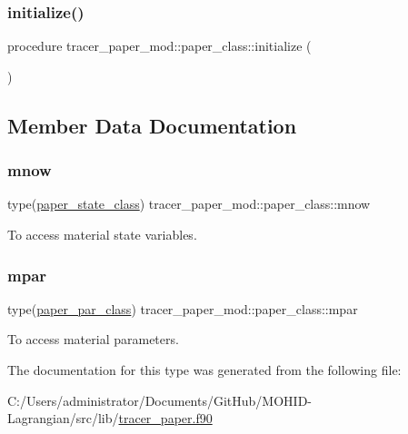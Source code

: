 \subsubsection{\texorpdfstring{initialize()}{initialize()}}
{\footnotesize\ttfamily procedure tracer\+\_\+paper\+\_\+mod\+::paper\+\_\+class\+::initialize (\begin{DoxyParamCaption}{ }\end{DoxyParamCaption})\hspace{0.3cm}{\ttfamily [private]}}



\subsection{Member Data Documentation}
\mbox{\label{structtracer__paper__mod_1_1paper__class_a7156f27ec83059ac3b701502a4320858}} 
\subsubsection{\texorpdfstring{mnow}{mnow}}
{\footnotesize\ttfamily type(\hyperlink{structtracer__paper__mod_1_1paper__state__class}{paper\+\_\+state\+\_\+class}) tracer\+\_\+paper\+\_\+mod\+::paper\+\_\+class\+::mnow\hspace{0.3cm}{\ttfamily [private]}}



To access material state variables. 

\mbox{\label{structtracer__paper__mod_1_1paper__class_a23ace4a6e578ffccaf1d5dcd91dc09b3}} 
\subsubsection{\texorpdfstring{mpar}{mpar}}
{\footnotesize\ttfamily type(\hyperlink{structtracer__paper__mod_1_1paper__par__class}{paper\+\_\+par\+\_\+class}) tracer\+\_\+paper\+\_\+mod\+::paper\+\_\+class\+::mpar\hspace{0.3cm}{\ttfamily [private]}}



To access material parameters. 



The documentation for this type was generated from the following file\+:\begin{DoxyCompactItemize}
\item 
C\+:/\+Users/administrator/\+Documents/\+Git\+Hub/\+M\+O\+H\+I\+D-\/\+Lagrangian/src/lib/\hyperlink{tracer__paper_8f90}{tracer\+\_\+paper.\+f90}\end{DoxyCompactItemize}
